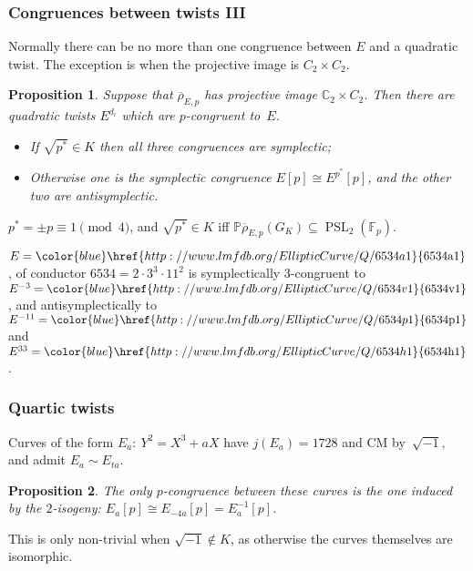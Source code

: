 \documentclass[handout]{beamer}
\newtheorem{prop}{Proposition}
\newcommand{\rhobar}{\overline{\rho}}
\newcommand{\F}{\mathbb F}
\newcommand{\C}{\mathbb C}
\newcommand{\PP}{\mathbb P}
\newcommand{\PSL}{\operatorname{PSL}}
\newcommand{\lmfdbec}[3]{\color{blue}\href{http://www.lmfdb.org/EllipticCurve/Q/#1#2#3}{{\text{\rm#1#2#3}}}}
\newcommand{\high}[1]{\emph{\color{blue}{#1}}}
\begin{document}
\begin{frame}\frametitle{Congruences between twists III}
  Normally there can be no more than one congruence between $E$ and a
  quadratic twist.  The exception is when the projective image is
  $C_2\times C_2$.

  \pause\medskip

  \begin{prop}
    Suppose that $\rhobar_{E,p}$ has projective image $\C_2\times
    C_2$.  Then there are \high{three} quadratic twists $E^{d_i}$
    which are $p$-congruent to~$E$.
  \begin{itemize}
  \item If $\sqrt{p^*}\in K$ then all three congruences are symplectic;
    \item Otherwise one is the symplectic congruence $E[p]\cong
      E^{p^*}[p]$, and the other two are antisymplectic.
  \end{itemize}
  \end{prop}
  $p^*=\pm p\equiv1\pmod4$, and $\sqrt{p^*}\in K$ iff
  $\PP\rhobar_{E,p}(G_K)\subseteq\PSL_2(\F_p)$.

  \pause\medskip

  \begin{example}
  $E=\lmfdbec{6534}{a}{1}$, of conductor $6534=2\cdot3^3\cdot11^2$ is
  symplectically $3$-congruent to $E^{-3}=\lmfdbec{6534}{v}{1}$, and
  antisymplectically to $E^{-11}=\lmfdbec{6534}{p}{1}$ and
  $E^{33}=\lmfdbec{6534}{h}{1}$.
  \end{example}
  
\end{frame}

\begin{frame}\frametitle{Quartic twists}
  Curves of the form $E_a:\ Y^2=X^3+aX$ have $j(E_a)=1728$ and CM
  by~$\sqrt{-1}$, and admit \high{quartic twists} $E_a\sim E_{ta}$.

  \pause\medskip

  \begin{prop}
  The only $p$-congruence between these curves is the one induced by
  the $2$-isogeny: $E_a[p]\cong E_{-4a}[p] = E_a^{-1}[p]$.
  \end{prop}
  \pause\medskip

  This is only non-trivial when $\sqrt{-1}\notin K$,
  as otherwise the curves themselves are isomorphic.

\end{frame}
\end{document}
